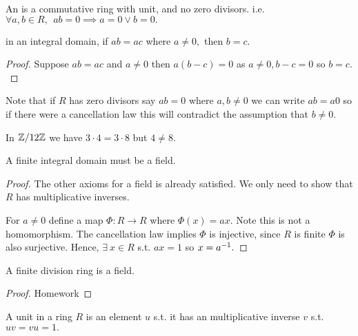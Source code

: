 \documentclass[a4paper]{article}
\begin{document}
\begin{definition}
    An  is a commutative ring with unit, and no zero divisors. i.e. $\forall a,b\in R,~~ab=0\implies a=0\lor b=0.$
\end{definition}
\begin{proposition}
     in an integral domain, if $ab=ac$ where $a\neq0,$ then $b=c.$
    \begin{proof}
        Suppose $ab=ac$ and $a\neq0$ then $a(b-c)=0$ as $a\neq 0,b-c=0$ so $b=c.$
    \end{proof}
\end{proposition}
Note that if $R$ has zero divisors say $ab=0$ where $a,b\neq0$ we can write $ab=a0$ so if there were a cancellation law this will contradict the assumption that $b\neq0.$

In $\mathbb{Z}/12\mathbb{Z}$ we have $3\cdot 4=3\cdot 8$ but $4\neq8.$

\begin{theorem}
    A finite integral domain must be a field.
    \begin{proof}
        The other axioms for a field is already satisfied. We only need to show that $R$ has multiplicative inverses.

        For $a\neq0$ define a map $\Phi:R\to R$ where $\Phi(x)=ax.$ Note this is not a homomorphism. The cancellation law implies $\Phi$ is injective, since $R$ is finite $\Phi$ is also surjective. Hence, $\exists~x\in R$ s.t. $ax=1$ so $x=a^{-1}.$
    \end{proof}
\end{theorem}
\begin{theorem}[Wedderburn]
    A finite division ring is a field.
    \begin{proof}
        Homework
    \end{proof}
\end{theorem}
\begin{definition}[Unit]
    A unit in a ring $R$ is an element $u$ s.t. it has an multiplicative inverse $v$ s.t. $uv=vu=1.$
\end{definition}
\end{document}
